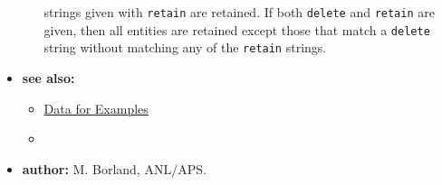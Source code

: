 \begin{itemize}
\begin{itemize}
        strings given with \verb|retain| are retained.  If both \verb|delete| and \verb|retain|
        are given, then all entities are retained except those that match a \verb|delete| string without
        matching any of the \verb|retain| strings.
    \end{itemize}
\item {\bf see also:}
    \begin{itemize}
    \item \hyperref[exampleData]{Data for Examples}
    \item {}
    \end{itemize}
\item {\bf author:} M. Borland, ANL/APS.
\end{itemize}

